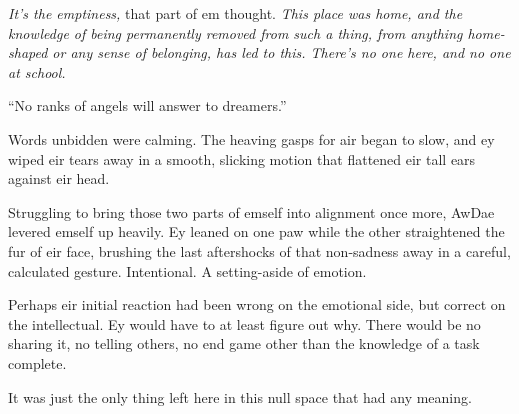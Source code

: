 \emph{It's the emptiness,} that part of em thought. \emph{This place was home, and the knowledge of being permanently removed from such a thing, from anything home-shaped or any sense of belonging, has led to this. There's no one here, and no one at school.}

``No ranks of angels will answer to dreamers.''

Words unbidden were calming. The heaving gasps for air began to slow, and ey wiped eir tears away in a smooth, slicking motion that flattened eir tall ears against eir head.

Struggling to bring those two parts of emself into alignment once more, AwDae levered emself up heavily. Ey leaned on one paw while the other straightened the fur of eir face, brushing the last aftershocks of that non-sadness away in a careful, calculated gesture. Intentional. A setting-aside of emotion.

Perhaps eir initial reaction had been wrong on the emotional side, but correct on the intellectual. Ey would have to at least figure out why. There would be no sharing it, no telling others, no end game other than the knowledge of a task complete.

It was just the only thing left here in this null space that had any meaning.

